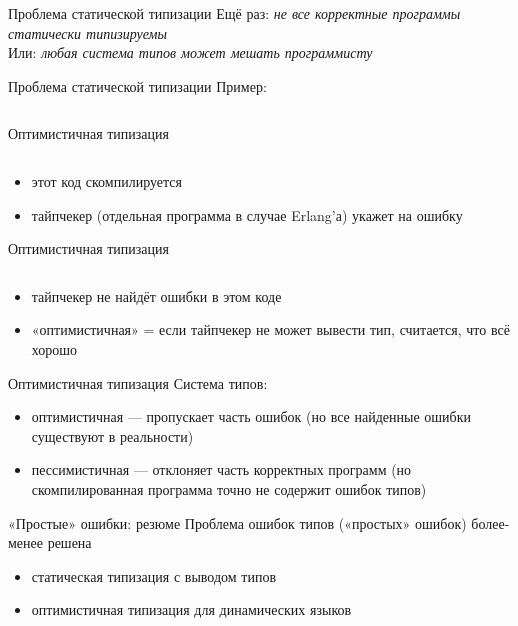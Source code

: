 \documentclass[10pt]{beamer}
\newcommand{\code}[4]{\inputminted[linenos, frame=none, firstline=#2, lastline=#3,
  framesep=10pt, bgcolor=lightgray]{#4}{#1}}
\begin{document}
\begin{frame}{Проблема статической типизации}
  Ещё раз: \emph{не все корректные программы статически типизируемы}\vspace{2em}\\
  Или: \emph{любая система типов может мешать программисту}
\end{frame}

\begin{frame}{Проблема статической типизации}
  Пример:
  \code{code.java}{17}{23}{java}
\end{frame}

\begin{frame}{Оптимистичная типизация}
  \code{code.erl}{1}{4}{erlang}
  \begin{itemize}
  \item этот код скомпилируется
  \item тайпчекер (отдельная программа в случае Erlang'а) укажет на ошибку
  \end{itemize}
\end{frame}

\begin{frame}{Оптимистичная типизация}
  \code{code.erl}{6}{11}{erlang}
  \begin{itemize}
  \item тайпчекер не найдёт ошибки в этом коде
  \item «оптимистичная» = если тайпчекер не может вывести тип, считается, что всё хорошо
  \end{itemize}
\end{frame}

\begin{frame}{Оптимистичная типизация}
  Система типов:
  \begin{itemize}
  \item оптимистичная — пропускает часть ошибок (но все найденные ошибки существуют в реальности)
  \item пессимистичная — отклоняет часть корректных программ (но скомпилированная программа точно не содержит ошибок типов)
  \end{itemize}
\end{frame}

\begin{frame}{«Простые» ошибки: резюме}
  Проблема ошибок типов («простых» ошибок) более-менее решена
  \begin{itemize}
  \item статическая типизация с выводом типов
  \item оптимистичная типизация для динамических языков
  \end{itemize}
\end{frame}
\end{document}
